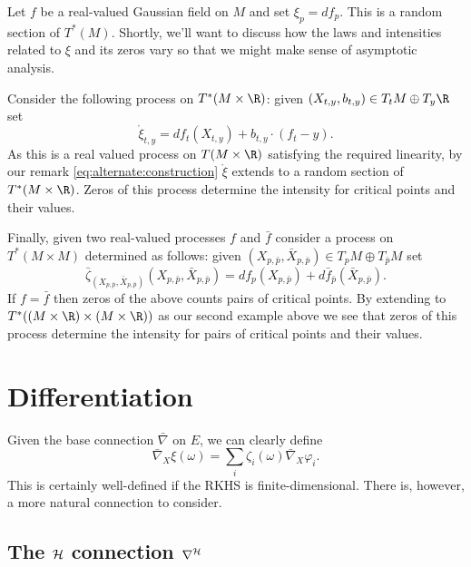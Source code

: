 \documentclass{article}
\newcommand{\randsec}{\xi}
\newcommand{\linprocess}{\mathring{\randsec}}
\begin{document}
Let $f$ be a real-valued Gaussian field on $M$ and set $\randsec_p = df_p$. This is a random section of $T^*(M)$. Shortly,
we'll want to discuss how the laws and intensities related to $\randsec$ and its zeros vary so that we might make
sense of asymptotic analysis. 

Consider the following process on $T^*(M \times \R)$: given $(X_{t,y}, b_{t,y}) \in T_t M \oplus T_y \R$ set
$$
\linprocess_{t,y} = df_t(X_{t,y}) + b_{t,y} \cdot (f_t - y).
$$
As this is a real valued process on $T(M \times \R)$ satisfying the required linearity, by our remark
\eqref{eq:alternate:construction} $\linprocess$ extends to a random section of $T^*(M \times \R)$. Zeros of
this process determine the intensity for critical points and their values.

Finally, given two real-valued processes $f$ and $\bar{f}$ consider a process on $T^*(M \times M)$ determined as follows: given $(X_{p,\bar{p}}, \bar{X}_{p,\bar{p}}) \in T_pM \oplus T_{\bar{p}}M$
set
$$
\bar{\zeta}_{(X_{p,\bar{p}}, \bar{X}_{p,\bar{p}})}(X_{p,\bar{p}}, \bar{X}_{p,\bar{p}}) = df_p(X_{p,\bar{p}}) + d\bar{f}_{\bar{p}}(\bar{X}_{p,\bar{p}}).
$$ If $f=\bar{f}$ then zeros of the above counts pairs of critical
points. By extending to $T^*((M \times \R) \times (M \times \R))$ as
our second example above we see that zeros of this process determine
the intensity for pairs of critical points and their values.

\section{Differentiation}

Given the base connection $\bar{\nabla}$ on $E$, we can clearly define
$$
\bar{\nabla}_X\randsec(\omega) = \sum_i \zeta_i(\omega) \bar{\nabla}_X \varphi_i.
$$
This is certainly well-defined if the RKHS is finite-dimensional. There is, however, a more natural
connection to consider.

\subsection{The ${\cal H}$ connection $\nabla^{\cal H}$}
\end{document}
